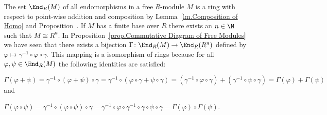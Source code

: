 \begin{rem}
The set $\End_R(M)$ of all endomorphisms in a free $R$-module $M$ is a ring with respect to point-wise addition and composition  by Lemma~\ref{lm.Composition of Homo} and Proposition~. If $M$ has a finite base over $R$ there exists an $n\in\N$ such that $M\cong R^n$. In Proposition~\ref{prop.Commutative Diagram of Free Modules} we have seen that there exists a bijection $\Gamma\colon\End_R(M)\to\End_R(R^n)$ defined by $\varphi\mapsto\gamma^{-1}\circ\varphi\circ\gamma$. This mapping is a isomorphism of rings because for all $\varphi,\psi\in\End_R(M)$ the following identities are satisfied:
\begin{compactenum}
\item $\Gamma(\varphi+\psi)=\gamma^{-1}\circ(\varphi+\psi)\circ\gamma =\gamma^{-1}\circ(\varphi\circ\gamma+\psi\circ\gamma)= (\gamma^{-1}\circ\varphi\circ\gamma)+(\gamma^{-1}\circ\psi\circ\gamma)=\Gamma(\varphi)+\Gamma(\psi)$ and
\item $\Gamma(\varphi\circ\psi)=\gamma^{-1}\circ(\varphi\circ\psi)\circ\gamma =\gamma^{-1}\circ\varphi\circ\gamma^{-1}\circ\gamma\circ\psi\circ\gamma =\Gamma(\varphi)\circ\Gamma(\psi)$.
\end{compactenum}
\end{rem}

